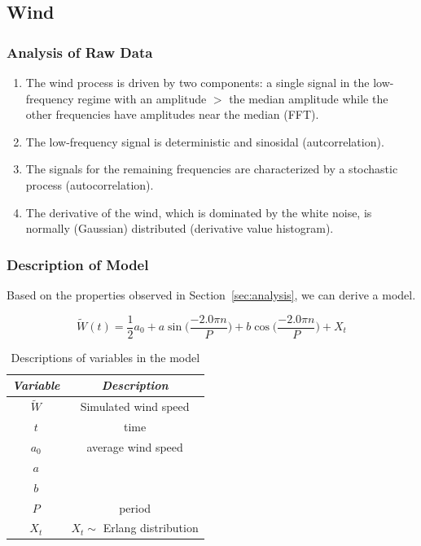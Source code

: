 \documentclass[11pt, letterpaper]{article}
\begin{document}
\subsection{Wind}

\subsubsection{Analysis of Raw Data}

\begin{enumerate}
\item The wind process is driven by two components: a single signal in the low-frequency regime with an amplitude $>$ the median amplitude while the other frequencies have amplitudes near the median (FFT).
\item The low-frequency signal is deterministic and sinosidal (autcorrelation).
\item The signals for the remaining frequencies are characterized by a stochastic process (autocorrelation).
\item The derivative of the wind, which is dominated by the white noise, is normally (Gaussian) distributed (derivative value histogram).
\end{enumerate}


\subsubsection{Description of Model}
Based on the properties observed in Section~\ref{sec:analysis}, we can derive a model.

\begin{equation}
\tilde{W}(t) = \frac{1}{2}a_0 + a \sin\Big(\frac{-2.0 \pi n}{P}\Big) + b \cos\Big(\frac{-2.0 \pi n}{P}\Big) + X_t
\end{equation}

\begin{table}[H]
  \centering
  \begin{tabular}{c c} \hline
  \emph{Variable} & \emph{Description}\\ \hline
  $\tilde{W}$ & Simulated wind speed \\ \hline
  $t$ & time \\ \hline
  $a_0$ & average wind speed \\ \hline
  $a$ & \\ \hline
  $b$ &  \\ \hline
  $P$ & period  \\ \hline
  $X_t$ & $X_t \sim$ Erlang distribution \\ \hline 
  \end{tabular}
  \caption{Descriptions of variables in the model}
  \label{tab:analysis-ft-values}
\end{table}
\end{document}
